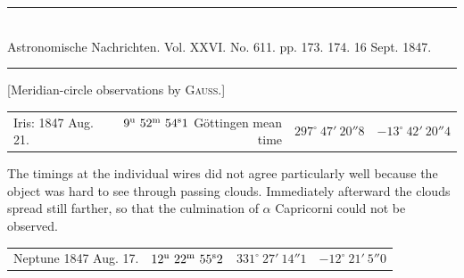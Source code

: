 \clearpage
{}
\begin{center}
\rule{0.55\linewidth}{0.4pt}\\[2pt]
Astronomische Nachrichten. Vol. XXVI. No. 611. pp. 173. 174. 16 Sept. 1847.\\[2pt]
\rule{0.55\linewidth}{0.4pt}
\end{center}
\begin{center}[Meridian-circle observations by \textsc{Gauss}.]\end{center}

\begin{center}
\small
\setlength{\tabcolsep}{2pt}
\begin{tabular}{@{}lrll@{}}
Iris: 1847 Aug. 21. & $9^{\rm u}\ 52^{\rm m}\ 54^{\rm s}1$ Göttingen mean time & $297^\circ\ 47'\ 20''8$ & $-13^\circ\ 42'\ 20''4$ \\
\end{tabular}
\end{center}

The timings at the individual wires did not agree particularly well because the object was hard to see through passing clouds. Immediately afterward the clouds spread still farther, so that the culmination of $\alpha$ Capricorni could not be observed.

\begin{center}
\small
\setlength{\tabcolsep}{4pt}
\begin{tabular}{lrrr}
Neptune 1847 Aug. 17. & $12^{\rm u}\ 22^{\rm m}\ 55^{\rm s}2$ & $331^\circ\ 27'\ 14''1$ & $-12^\circ\ 21'\ 5''0$ \\
\end{tabular}
\end{center}

